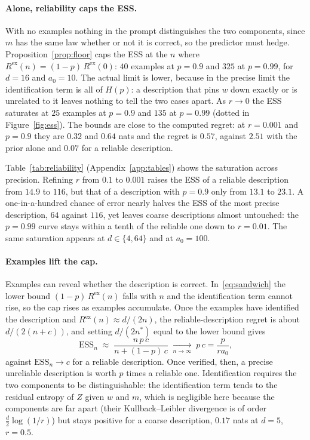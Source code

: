 \documentclass[10pt]{article}
\newcommand{\ess}{\mathrm{ESS}}
\begin{document}
\paragraph{Alone, reliability caps the ESS.}
With no examples nothing in the prompt distinguishes the two components, since $m$ has the same law whether or not it is correct, so the predictor must hedge. Proposition~\ref{prop:floor} caps the ESS at the $n$ where $R^{\mathrm{ex}}(n) = (1-p)\,R^{\mathrm{ex}}(0)$: $40$ examples at $p = 0.9$ and $325$ at $p = 0.99$, for $d = 16$ and $a_0 = 10$. The actual limit is lower, because in the precise limit the identification term is all of $H(p)$: a description that pins $w$ down exactly or is unrelated to it leaves nothing to tell the two cases apart. As $r \to 0$ the ESS saturates at $25$ examples at $p = 0.9$ and $135$ at $p = 0.99$ (dotted in Figure~\ref{fig:ess}). The bounds are close to the computed regret: at $r = 0.001$ and $p = 0.9$ they are $0.32$ and $0.64$ nats and the regret is $0.57$, against $2.51$ with the prior alone and $0.07$ for a reliable description.

Table~\ref{tab:reliability} (Appendix~\ref{app:tables}) shows the saturation across precision. Refining $r$ from $0.1$ to $0.001$ raises the ESS of a reliable description from $14.9$ to $116$, but that of a description with $p = 0.9$ only from $13.1$ to $23.1$. A one-in-a-hundred chance of error nearly halves the ESS of the most precise description, $64$ against $116$, yet leaves coarse descriptions almost untouched: the $p = 0.99$ curve stays within a tenth of the reliable one down to $r = 0.01$. The same saturation appears at $d \in \{4, 64\}$ and at $a_0 = 100$.

\paragraph{Examples lift the cap.}
Examples can reveal whether the description is correct. In~\eqref{eq:sandwich} the lower bound $(1-p)\,R^{\mathrm{ex}}(n)$ falls with $n$ and the identification term cannot rise, so the cap rises as examples accumulate. Once the examples have identified the description and $R^{\mathrm{ex}}(n) \approx d/(2n)$, the reliable-description regret is about $d/(2(n + c))$, and setting $d/(2n^*)$ equal to the lower bound gives
\begin{equation}\label{eq:ess-n}
\ess_n \;\approx\; \frac{n\,p\,c}{n + (1-p)\,c} \;\xrightarrow[n \to \infty]{}\; p\,c = \frac{p}{r a_0},
\end{equation}
against $\ess_n \to c$ for a reliable description. Once verified, then, a precise unreliable description is worth $p$ times a reliable one. Identification requires the two components to be distinguishable: the identification term tends to the residual entropy of $Z$ given $w$ and $m$, which is negligible here because the components are far apart (their Kullback--Leibler divergence is of order $\tfrac{d}{2}\log(1/r)$) but stays positive for a coarse description, $0.17$ nats at $d = 5$, $r = 0.5$.
\end{document}
